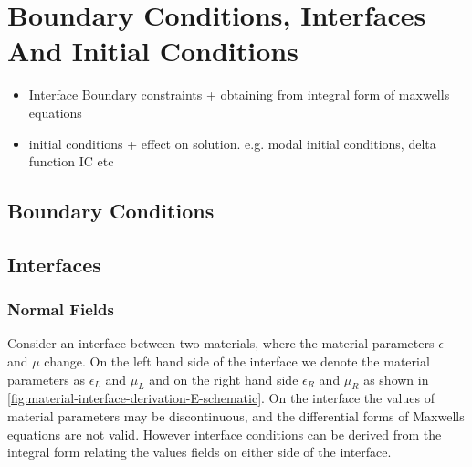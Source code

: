 \section{Boundary Conditions, Interfaces And Initial Conditions}
\begin{itemize}
	\item Interface Boundary constraints + obtaining from integral form of maxwells equations
	\item initial conditions + effect on solution. e.g. modal initial conditions, delta function IC etc
\end{itemize}

\subsection{Boundary Conditions}

% 



\subsection{Interfaces}

\subsubsection{Normal Fields}

Consider an interface between two materials, where the material parameters $\epsilon$ and $\mu$ change. On the left hand side of the interface we denote the material parameters as $\epsilon_L$ and $\mu_L$ and on the right hand side $\epsilon_R$ and $\mu_R$ as shown in \ref{fig:material-interface-derivation-E-schematic}. On the interface the values of material parameters may be discontinuous, and the differential forms of Maxwells equations are not valid. However interface conditions can be derived from the integral form relating the values fields on either side of the interface.

